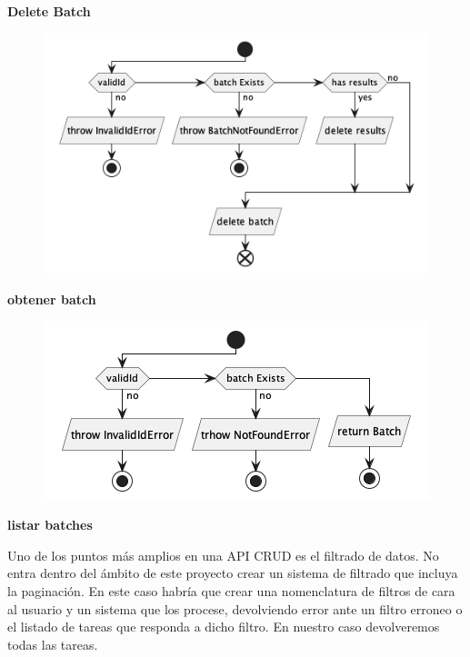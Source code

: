 \textbf{Delete Batch}

\begin{figure}[H]
    \centering
    \includegraphics[height=0.2\textheight]{./part/Proyecto_ejecutivo/memoria_descriptiva/descripcionDelProyecto/manager/uml/deleteBatchUseCase}
    \caption[Diagrama de objetos de dominio]{}\label{fig:deleteBatchUseCase}
\end{figure}

\textbf{obtener batch}

\begin{figure}[H]
    \centering
    \includegraphics[height=0.2\textheight]{./part/Proyecto_ejecutivo/memoria_descriptiva/descripcionDelProyecto/manager/uml/getBatchUseCase}
    \caption[Diagrama de objetos de dominio]{}\label{fig:getBatchUseCase}
\end{figure}

\textbf{listar batches}

Uno de los puntos más amplios en una API CRUD es el filtrado de datos. No entra dentro del ámbito de este proyecto crear un sistema de filtrado que incluya la paginación. En este caso habría que crear una nomenclatura de filtros de cara al usuario y un sistema que los procese, devolviendo error ante un filtro erroneo o el listado de tareas que responda a dicho filtro. En nuestro caso devolveremos todas las tareas.

